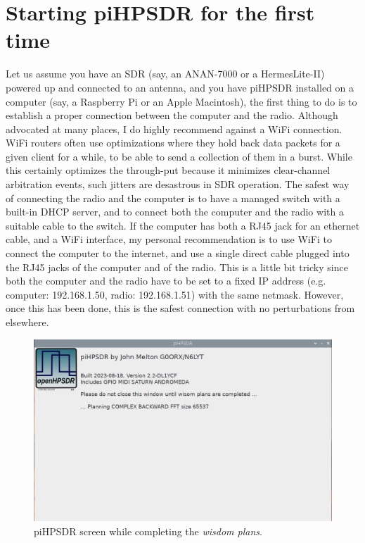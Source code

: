 \documentclass[12pt]{book}
\begin{document}
\chapter{Starting piHPSDR for the first time}
Let us assume you have an SDR (say, an ANAN-7000 or a HermesLite-II) powered up and connected to an antenna,
and you have piHPSDR installed on a computer (say, a Raspberry Pi or an Apple Macintosh), the first thing to
do is to establish a proper connection between the computer and the radio. Although advocated at many places,
I do highly recommend against a WiFi connection. WiFi routers often use optimizations where they hold
back data packets for a given client for a while, to be able to send a collection of them in a burst. While
this certainly optimizes the through-put because it minimizes clear-channel arbitration events, such jitters
are desastrous in SDR operation. The safest way of connecting the radio and the computer is to have a
managed switch with a built-in DHCP server, and to connect both the computer and the radio with a suitable
cable to the switch. If the computer has both a RJ45 jack for an ethernet cable, and a WiFi interface, my
personal recommendation is to use WiFi to connect the computer to the internet, and use a single direct cable plugged
into the RJ45 jacks of the computer and of the radio. This is a little bit tricky since both the computer
and the radio have to be set to a fixed IP address (e.g. computer: 192.168.1.50, radio: 192.168.1.51) with
the same netmask. However, once this has been done, this is the safest connection with no perturbations from
elsewhere.

\begin{figure}
\center
\includegraphics[width=12cm]{Planning.png}
\caption{piHPSDR screen while completing the \textit{wisdom plans}.}
\label{fig:Planning}
\end{figure}
\end{document}
